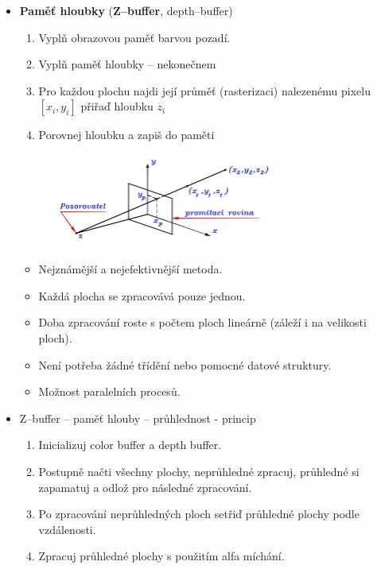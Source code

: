 \begin{itemize}
\begin{figure}[H]
		\end{figure}
	\item \textbf{Paměť hloubky} (\textbf{Z--buffer}, depth--buffer)
	\begin{enumerate}
				\item Vyplň obrazovou paměť barvou pozadí.
				\item Vyplň paměť hloubky -- nekonečnem
				\item Pro každou plochu najdi její průměť (rasterizaci) nalezenému pixelu $[x_i,y_i]$ přiřaď hloubku $z_i$
				\item Porovnej hloubku a zapiš do paměti 
	\end{enumerate}
		\begin{figure}[H]
		\centering
		\includegraphics[width=0.7\textwidth]{assets/5_zbuffer}
		\end{figure}
		\begin{itemize}
		\item Nejznámější a nejefektivnější metoda.
		\item Každá plocha se zpracovává pouze jednou.
		\item Doba zpracování roste s počtem ploch lineárně (záleží i na velikosti ploch).
		\item Není potřeba žádné třídění nebo pomocné datové struktury.
		\item Možnost paralelních procesů.
		\end{itemize}
	\item Z--buffer -- paměť hlouby -- průhlednost - princip
	\begin{enumerate}
		\item Inicializuj color buffer a depth buffer.
		\item Postupně načti všechny plochy, neprůhledné zpracuj, průhledné si zapamatuj a odlož pro následné zpracování.
		\item Po zpracování neprůhledných ploch setřiď průhledné plochy podle vzdálenosti.
		\item Zpracuj průhledné plochy s použitím alfa míchání.
	\end{enumerate}
\end{itemize}
